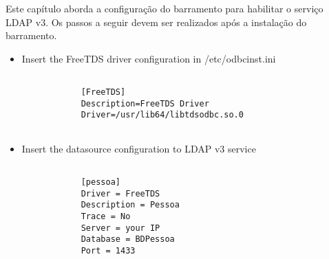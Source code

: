 \label{config}

Este capítulo aborda a configuração do barramento para habilitar o serviço LDAP v3. Os
passos a seguir devem ser realizados após a instalação do barramento.


\begin{itemize}


	\item  Insert the FreeTDS driver configuration in /etc/odbcinst.ini 

	
		\renewcommand{\lstlistingname}{Código}             
		\begin{lstlisting}[Adding Erlang repository entry, label=passo1] 

			[FreeTDS]
			Description=FreeTDS Driver
			Driver=/usr/lib64/libtdsodbc.so.0
			
		\end{lstlisting}	

	
	\item  Insert the datasource configuration to LDAP v3 service
	
		\renewcommand{\lstlistingname}{Código}             
		\begin{lstlisting}[Adding Erlang repository entry, label=passo1] 

			[pessoa]
			Driver = FreeTDS
			Description = Pessoa
			Trace = No
			Server = your IP
			Database = BDPessoa
			Port = 1433			

		\end{lstlisting}	
	
	
\end{itemize}

